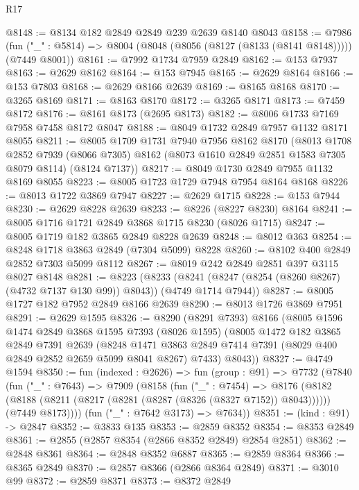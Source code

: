 \begin{lexlean}{R17}
\begin{coremodule}
@8148 := @8134 @182 @2849 @2849 @239 @2639 @8140 @8043
@8158 := @7986
    (fun ("_" : @5814) => @8004 (@8048 (@8056 (@8127 (@8133 (@8141 @8148))))) (@7449 @8001))
@8161 := @7992 @1734 @7959 @2849
@8162 := @153 @7937
@8163 := @2629 @8162
@8164 := @153 @7945
@8165 := @2629 @8164
@8166 := @153 @7803
@8168 := @2629 @8166 @2639
@8169 := @8165 @8168
@8170 := @3265 @8169
@8171 := @8163 @8170
@8172 := @3265 @8171
@8173 := @7459 @8172
@8176 := @8161 @8173 (@2695 @8173)
@8182 := @8006 @1733 @7169 @7958 @7458 @8172 @8047
@8188 := @8049 @1732 @2849 @7957 @1132 @8171 @8055
@8211 := @8005
    @1709
    @1731
    @7940
    @7956
    @8162
    @8170
    (@8013
      @1708
      @2852
      @7939
      (@8066 @7305)
      @8162
      (@8073 @1610 @2849 @2851 @1583 @7305 @8079 @8114)
      (@8124 @7137))
@8217 := @8049 @1730 @2849 @7955 @1132 @8169 @8055
@8223 := @8005 @1723 @1729 @7948 @7954 @8164 @8168
@8226 := @8013 @1722 @3869 @7947
@8227 := @2629 @1715
@8228 := @153 @7944
@8230 := @2629 @8228 @2639
@8233 := @8226 (@8227 @8230) @8164
@8241 := @8005 @1716 @1721 @2849 @3868 @1715 @8230 (@8026 @1715)
@8247 := @8005 @1719 @182 @3865 @2849 @8228 @2639
@8248 := @8012 @363
@8254 := @8248 @1718 @3863 @2849 (@7304 @5099) @8228
@8260 := @8102 @400 @2849 @2852 @7303 @5099 @8112
@8267 := @8019 @242 @2849 @2851 @397 @3115 @8027 @8148
@8281 := @8223
    (@8233 (@8241 (@8247 (@8254 (@8260 @8267) (@4732 @7137 @130 @99)) @8043)) (@4749 @1714 @7944))
@8287 := @8005 @1727 @182 @7952 @2849 @8166 @2639
@8290 := @8013 @1726 @3869 @7951
@8291 := @2629 @1595
@8326 := @8290
    (@8291 @7393)
    @8166
    (@8005
      @1596
      @1474
      @2849
      @3868
      @1595
      @7393
      (@8026 @1595)
      (@8005
        @1472
        @182
        @3865
        @2849
        @7391
        @2639
        (@8248 @1471 @3863 @2849 @7414 @7391 (@8029 @400 @2849 @2852 @2659 @5099 @8041 @8267) @7433)
        @8043))
@8327 := @4749 @1594
@8350 := fun (indexed : @2626) =>
  fun (group : @91) =>
  @7732
    (@7840
      (fun ("_" : @7643) =>
      @7909
        (@8158
          (fun ("_" : @7454) =>
          @8176
            (@8182 (@8188 (@8211 (@8217 (@8281 (@8287 (@8326 (@8327 @7152)) @8043))))))
            (@7449 @8173))))
      (fun ("_" : @7642 @3173) => @7634))
@8351 := (kind : @91) -> @2847
@8352 := @3833 @135
@8353 := @2859 @8352
@8354 := @8353 @2849
@8361 := @2855 (@2857 @8354 (@2866 @8352 @2849) @2854 @2851)
@8362 := @2848 @8361
@8364 := @2848 @8352 @6887
@8365 := @2859 @8364
@8366 := @8365 @2849
@8370 := @2857 @8366 (@2866 @8364 @2849)
@8371 := @3010 @99
@8372 := @2859 @8371
@8373 := @8372 @2849

\end{coremodule}
\end{lexlean}
